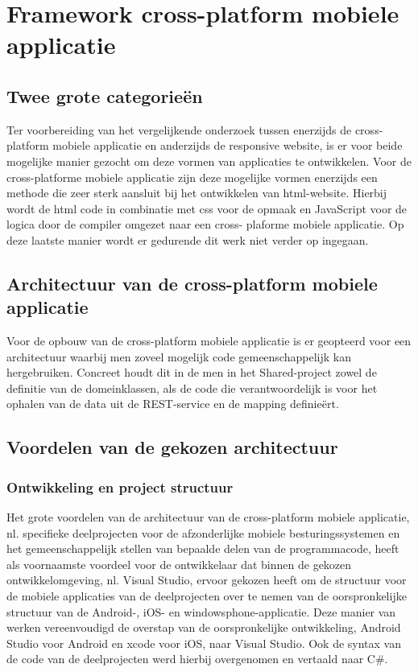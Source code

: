 \chapter{Framework cross-platform mobiele applicatie}
\label{ch:frameworkcrossplatformapp}
\section{Twee grote categorieën}
Ter voorbereiding van het vergelijkende onderzoek tussen enerzijds de cross-platform mobiele applicatie en anderzijds de
responsive website, is er voor beide mogelijke manier gezocht om deze vormen van applicaties te ontwikkelen. Voor de cross-platforme
mobiele applicatie zijn deze mogelijke vormen enerzijds een methode die zeer sterk aansluit bij het ontwikkelen van html-website.
Hierbij wordt de html code in combinatie met css voor de opmaak en JavaScript voor de logica door de compiler omgezet naar een cross-
plaforme mobiele applicatie. Op deze laatste manier wordt er gedurende dit werk niet verder op ingegaan.

\label{sec:architectuurvandecrossplatformemobieleapplicatie}
\section{Architectuur van de cross-platform mobiele applicatie}
Voor de opbouw van de cross-platform mobiele applicatie is er geopteerd voor een architectuur waarbij men zoveel mogelijk
code gemeenschappelijk kan hergebruiken. Concreet houdt dit in de men in het Shared-project zowel de definitie van de domeinklassen,
als de code die verantwoordelijk is voor het ophalen van de data uit de REST-service en de mapping definieërt.

\label{sec:voordelenvandegekozenapparchitectuur}
\section{Voordelen van de gekozen architectuur}
\subsection{Ontwikkeling en project structuur}
Het grote voordelen van de architectuur van de cross-platform mobiele applicatie, nl. specifieke deelprojecten voor de afzonderlijke
mobiele besturingssystemen en het gemeenschappelijk stellen van bepaalde delen van de programmacode, heeft als voornaamste voordeel
voor de ontwikkelaar dat binnen de gekozen ontwikkelomgeving, nl. Visual Studio, ervoor gekozen heeft om de structuur voor de
mobiele applicaties van de deelprojecten over te nemen van de oorspronkelijke structuur van de Android-, iOS- en windowsphone-applicatie.
Deze manier van werken vereenvoudigd de overstap van de oorspronkelijke ontwikkeling, Android Studio voor Android en xcode voor iOS, naar Visual Studio.
Ook de syntax van de code van de deelprojecten werd hierbij overgenomen en vertaald naar C\#.

